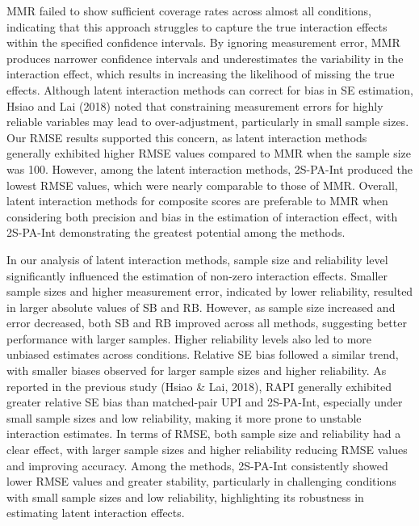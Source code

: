 \documentclass[
  man]{apa6}
\begin{document}
MMR failed to show sufficient coverage rates across almost all conditions, indicating that this approach struggles to capture the true interaction effects within the specified confidence intervals. By ignoring measurement error, MMR produces narrower confidence intervals and underestimates the variability in the interaction effect, which results in increasing the likelihood of missing the true effects. Although latent interaction methods can correct for bias in SE estimation, Hsiao and Lai (2018) noted that constraining measurement errors for highly reliable variables may lead to over-adjustment, particularly in small sample sizes. Our RMSE results supported this concern, as latent interaction methods generally exhibited higher RMSE values compared to MMR when the sample size was 100. However, among the latent interaction methods, 2S-PA-Int produced the lowest RMSE values, which were nearly comparable to those of MMR. Overall, latent interaction methods for composite scores are preferable to MMR when considering both precision and bias in the estimation of interaction effect, with 2S-PA-Int demonstrating the greatest potential among the methods.

In our analysis of latent interaction methods, sample size and reliability level significantly influenced the estimation of non-zero interaction effects. Smaller sample sizes and higher measurement error, indicated by lower reliability, resulted in larger absolute values of SB and RB. However, as sample size increased and error decreased, both SB and RB improved across all methods, suggesting better performance with larger samples. Higher reliability levels also led to more unbiased estimates across conditions. Relative SE bias followed a similar trend, with smaller biases observed for larger sample sizes and higher reliability. As reported in the previous study (Hsiao \& Lai, 2018), RAPI generally exhibited greater relative SE bias than matched-pair UPI and 2S-PA-Int, especially under small sample sizes and low reliability, making it more prone to unstable interaction estimates. In terms of RMSE, both sample size and reliability had a clear effect, with larger sample sizes and higher reliability reducing RMSE values and improving accuracy. Among the methods, 2S-PA-Int consistently showed lower RMSE values and greater stability, particularly in challenging conditions with small sample sizes and low reliability, highlighting its robustness in estimating latent interaction effects.
\end{document}
